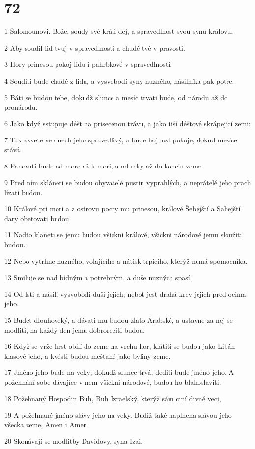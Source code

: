 \chapter{72}

\par 1 Šalomounovi. Bože, soudy své králi dej, a spravedlnost svou synu královu,
\par 2 Aby soudil lid tvuj v spravedlnosti a chudé tvé v pravosti.
\par 3 Hory prinesou pokoj lidu i pahrbkové v spravedlnosti.
\par 4 Souditi bude chudé z lidu, a vysvobodí syny nuzného, násilníka pak potre.
\par 5 Báti se budou tebe, dokudž slunce a mesíc trvati bude, od národu až do pronárodu.
\par 6 Jako když sstupuje déšt na prisecenou trávu, a jako tiší déštové skrápející zemi:
\par 7 Tak zkvete ve dnech jeho spravedlivý, a bude hojnost pokoje, dokud mesíce stává.
\par 8 Panovati bude od more až k mori, a od reky až do koncin zeme.
\par 9 Pred ním skláneti se budou obyvatelé pustin vyprahlých, a neprátelé jeho prach lízati budou.
\par 10 Králové pri mori a z ostrovu pocty mu prinesou, králové Šebejští a Sabejští dary obetovati budou.
\par 11 Nadto klaneti se jemu budou všickni králové, všickni národové jemu sloužiti budou.
\par 12 Nebo vytrhne nuzného, volajícího a nátisk trpícího, kterýž nemá spomocníka.
\par 13 Smiluje se nad bídným a potrebným, a duše nuzných spasí.
\par 14 Od lsti a násilí vysvobodí duši jejich; nebot jest drahá krev jejich pred ocima jeho.
\par 15 Budet dlouhoveký, a dávati mu budou zlato Arabské, a ustavne za nej se modliti, na každý den jemu dobroreciti budou.
\par 16 Když se vrže hrst obilí do zeme na vrchu hor, klátiti se budou jako Libán klasové jeho, a kvésti budou meštané jako byliny zeme.
\par 17 Jméno jeho bude na veky; dokudž slunce trvá, dediti bude jméno jeho. A požehnání sobe dávajíce v nem všickni národové, budou ho blahoslaviti.
\par 18 Požehnaný Hospodin Buh, Buh Izraelský, kterýž sám ciní divné veci,
\par 19 A požehnané jméno slávy jeho na veky. Budiž také naplnena slávou jeho všecka zeme, Amen i Amen.
\par 20 Skonávají se modlitby Davidovy, syna Izai.

